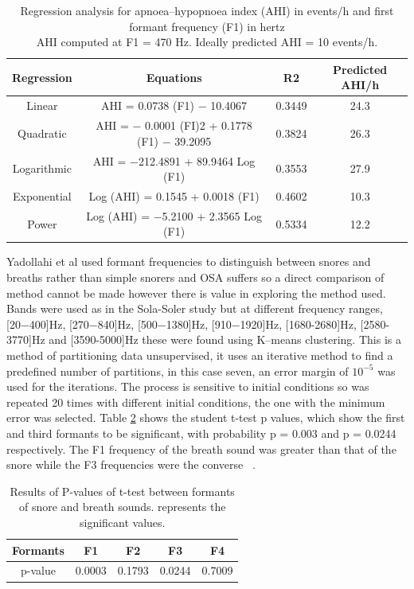 \begin{table}[h]
\centering
\begin{tabular}{c c c c}
\toprule
Regression&Equations&R2&Predicted AHI/h\\ \midrule
Linear&AHI = 0.0738 (F1) − 10.4067&0.3449&24.3\\ 
Quadratic&AHI = − 0.0001 (FI)2 + 0.1778 (F1) − 39.2095&0.3824&26.3\\ 
Logarithmic&AHI = −212.4891 + 89.9464 Log (F1)&0.3553&27.9\\ 
Exponential&Log (AHI) = 0.1545 + 0.0018 (F1)&0.4602&10.3\\ 
Power&Log (AHI) = −5.2100 + 2.3565 Log (F1)&0.5334&12.2\\ \bottomrule
\end{tabular}
\caption{Regression analysis for apnoea–hypopnoea index (AHI) in events/h and first formant frequency (F1) in hertz \\ AHI computed at F1 = 470 Hz. Ideally predicted AHI = 10 events/h.}
\label{table:ng2008aformantstable2}
\end{table}
Yadollahi et al used formant frequencies to distinguish between snores and breaths rather than simple snorers and OSA suffers so a direct comparison of method cannot be made however there is value in exploring the method used. Bands were used as in the Sola-Soler study but at different frequency ranges, [20−400]Hz, [270−840]Hz, [500−1380]Hz, [910−1920]Hz, [1680-2680]Hz, [2580-3770]Hz and [3590-5000]Hz these were found using K–means clustering. This is a method of partitioning data unsupervised, it uses an iterative method to find a predefined number of partitions, in this case seven, an error margin of $10^{−5}$ was used for the iterations. The process is sensitive to initial conditions so was repeated 20 times with different initial conditions, the one with the minimum error was selected. Table \ref{table:yadollahi2009formant} shows the student t-test p values, which show the first and third formants to be significant, with probability p = 0.003 and p = 0.0244 respectively. The F1 frequency of the breath sound was greater than that of the snore while the F3 frequencies were the converse ~\cite{yadollahi2009formant}.

\begin{table}[h]
\centering
\begin{tabular}{c c c c c}
\toprule
Formants&F1&F2&F3&F4\\ \midrule
p-value&0.0003\*&0.1793&0.0244\*&0.7009\\ \bottomrule
\end{tabular}
\caption{Results of P-values of t-test between formants of snore and breath sounds. \* represents the significant values.}
\label{table:yadollahi2009formant}
\end{table}
